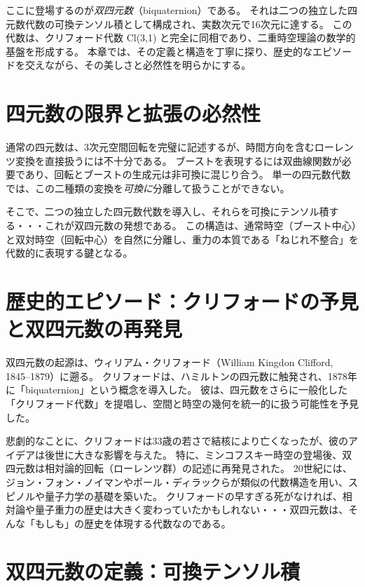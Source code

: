 \documentclass[dvipdfmx,a4paper]{jsbook}
\theoremstyle{definition}
\theoremstyle{remark}
\begin{document}
ここに登場するのが\emph{双四元数}（biquaternion）である。
それは二つの独立した四元数代数の可換テンソル積として構成され、実数次元で16次元に達する。
この代数は、クリフォード代数 Cl(3,1) と完全に同相であり、二重時空理論の数学的基盤を形成する。
本章では、その定義と構造を丁寧に探り、歴史的なエピソードを交えながら、その美しさと必然性を明らかにする。

\section{四元数の限界と拡張の必然性}
\label{sec:biquaternion-necessity}

通常の四元数は、3次元空間回転を完璧に記述するが、時間方向を含むローレンツ変換を直接扱うには不十分である。
ブーストを表現するには双曲線関数が必要であり、回転とブーストの生成元は非可換に混じり合う。
単一の四元数代数では、この二種類の変換を\emph{可換に}分離して扱うことができない。

そこで、二つの独立した四元数代数を導入し、それらを可換にテンソル積する・・・これが双四元数の発想である。
この構造は、通常時空（ブースト中心）と双対時空（回転中心）を自然に分離し、重力の本質である「ねじれ不整合」を代数的に表現する鍵となる。

\section{歴史的エピソード：クリフォードの予見と双四元数の再発見}
\label{sec:clifford-episode}

双四元数の起源は、ウィリアム・クリフォード（William Kingdon Clifford, 1845--1879）に遡る。
クリフォードは、ハミルトンの四元数に触発され、1878年に「biquaternion」という概念を導入した。
彼は、四元数をさらに一般化した「クリフォード代数」を提唱し、空間と時空の幾何を統一的に扱う可能性を予見した。

悲劇的なことに、クリフォードは33歳の若さで結核により亡くなったが、彼のアイデアは後世に大きな影響を与えた。
特に、ミンコフスキー時空の登場後、双四元数は相対論的回転（ローレンツ群）の記述に再発見された。
20世紀には、ジョン・フォン・ノイマンやポール・ディラックらが類似の代数構造を用い、スピノルや量子力学の基礎を築いた。
クリフォードの早すぎる死がなければ、相対論や量子重力の歴史は大きく変わっていたかもしれない・・・双四元数は、そんな「もしも」の歴史を体現する代数なのである。

\section{双四元数の定義：可換テンソル積}
\label{sec:biquaternion-definition}
\end{document}
